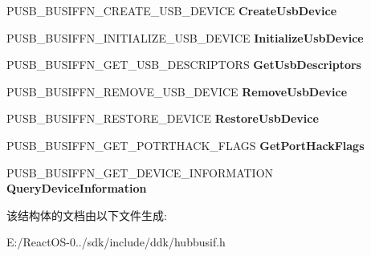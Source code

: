 \begin{DoxyCompactItemize}
P\+U\+S\+B\+\_\+\+B\+U\+S\+I\+F\+F\+N\+\_\+\+C\+R\+E\+A\+T\+E\+\_\+\+U\+S\+B\+\_\+\+D\+E\+V\+I\+CE {\bfseries Create\+Usb\+Device}
\item 
\mbox{\label{struct___u_s_b___b_u_s___i_n_t_e_r_f_a_c_e___h_u_b___v1_aa248320422cf4c8fd4099dca2671b979}} 
P\+U\+S\+B\+\_\+\+B\+U\+S\+I\+F\+F\+N\+\_\+\+I\+N\+I\+T\+I\+A\+L\+I\+Z\+E\+\_\+\+U\+S\+B\+\_\+\+D\+E\+V\+I\+CE {\bfseries Initialize\+Usb\+Device}
\item 
\mbox{\label{struct___u_s_b___b_u_s___i_n_t_e_r_f_a_c_e___h_u_b___v1_aff7550cefda69ba930be92c1b3c20b5a}} 
P\+U\+S\+B\+\_\+\+B\+U\+S\+I\+F\+F\+N\+\_\+\+G\+E\+T\+\_\+\+U\+S\+B\+\_\+\+D\+E\+S\+C\+R\+I\+P\+T\+O\+RS {\bfseries Get\+Usb\+Descriptors}
\item 
\mbox{\label{struct___u_s_b___b_u_s___i_n_t_e_r_f_a_c_e___h_u_b___v1_a8c3758ea116b0488e8e1a06b4ce833d1}} 
P\+U\+S\+B\+\_\+\+B\+U\+S\+I\+F\+F\+N\+\_\+\+R\+E\+M\+O\+V\+E\+\_\+\+U\+S\+B\+\_\+\+D\+E\+V\+I\+CE {\bfseries Remove\+Usb\+Device}
\item 
\mbox{\label{struct___u_s_b___b_u_s___i_n_t_e_r_f_a_c_e___h_u_b___v1_a906ad600ac8443b218c12545f2bf4705}} 
P\+U\+S\+B\+\_\+\+B\+U\+S\+I\+F\+F\+N\+\_\+\+R\+E\+S\+T\+O\+R\+E\+\_\+\+D\+E\+V\+I\+CE {\bfseries Restore\+Usb\+Device}
\item 
\mbox{\label{struct___u_s_b___b_u_s___i_n_t_e_r_f_a_c_e___h_u_b___v1_abdc2e397d1123f7242c8136509136164}} 
P\+U\+S\+B\+\_\+\+B\+U\+S\+I\+F\+F\+N\+\_\+\+G\+E\+T\+\_\+\+P\+O\+T\+R\+T\+H\+A\+C\+K\+\_\+\+F\+L\+A\+GS {\bfseries Get\+Port\+Hack\+Flags}
\item 
\mbox{\label{struct___u_s_b___b_u_s___i_n_t_e_r_f_a_c_e___h_u_b___v1_afb8f575c66d2daf5d8a819f8601e81c1}} 
P\+U\+S\+B\+\_\+\+B\+U\+S\+I\+F\+F\+N\+\_\+\+G\+E\+T\+\_\+\+D\+E\+V\+I\+C\+E\+\_\+\+I\+N\+F\+O\+R\+M\+A\+T\+I\+ON {\bfseries Query\+Device\+Information}
\end{DoxyCompactItemize}


该结构体的文档由以下文件生成\+:\begin{DoxyCompactItemize}
\item 
E\+:/\+React\+O\+S-\/0../sdk/include/ddk/hubbusif.\+h\end{DoxyCompactItemize}

